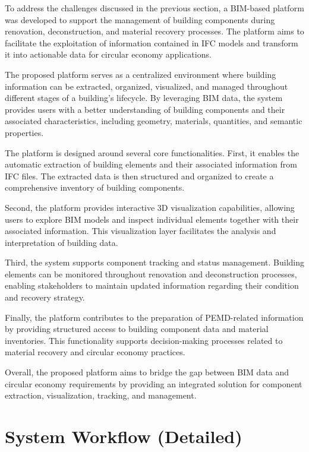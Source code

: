 \documentclass[11pt,a4paper]{article}
\begin{document}
To address the challenges discussed in the previous section, a BIM-based platform was developed to support the management of building components during renovation, deconstruction, and material recovery processes. The platform aims to facilitate the exploitation of information contained in IFC models and transform it into actionable data for circular economy applications.

The proposed platform serves as a centralized environment where building information can be extracted, organized, visualized, and managed throughout different stages of a building's lifecycle. By leveraging BIM data, the system provides users with a better understanding of building components and their associated characteristics, including geometry, materials, quantities, and semantic properties.

The platform is designed around several core functionalities. First, it enables the automatic extraction of building elements and their associated information from IFC files. The extracted data is then structured and organized to create a comprehensive inventory of building components.

Second, the platform provides interactive 3D visualization capabilities, allowing users to explore BIM models and inspect individual elements together with their associated information. This visualization layer facilitates the analysis and interpretation of building data.

Third, the system supports component tracking and status management. Building elements can be monitored throughout renovation and deconstruction processes, enabling stakeholders to maintain updated information regarding their condition and recovery strategy.

Finally, the platform contributes to the preparation of PEMD-related information by providing structured access to building component data and material inventories. This functionality supports decision-making processes related to material recovery and circular economy practices.

Overall, the proposed platform aims to bridge the gap between BIM data and circular economy requirements by providing an integrated solution for component extraction, visualization, tracking, and management.

\section{System Workflow (Detailed)}
\label{sec:workflow}
\end{document}
